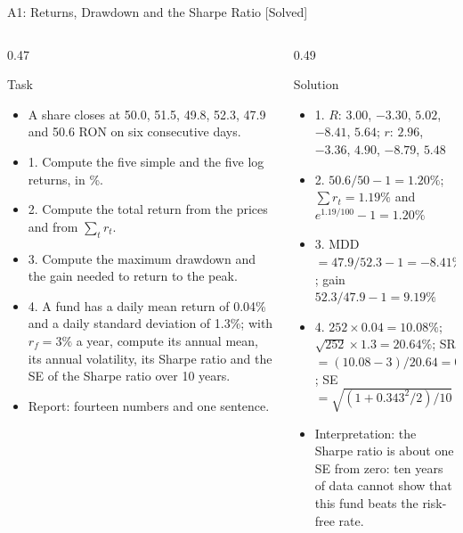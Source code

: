 \begin{frame}{A1: Returns, Drawdown and the Sharpe Ratio [Solved]}
\itemsize{\scriptsize}
\begin{columns}[T]
\begin{column}{0.47\textwidth}
\begin{block}{Task}
\begin{itemize}
    \item A share closes at 50.0, 51.5, 49.8, 52.3, 47.9 and 50.6 RON on six consecutive days.
    \item 1. Compute the five simple and the five log returns, in \%.
    \item 2. Compute the total return from the prices and from $\sum_t r_t$.
    \item 3. Compute the maximum drawdown and the gain needed to return to the peak.
    \item 4. A fund has a daily mean return of 0.04\% and a daily standard deviation of 1.3\%; with $r_f = 3\%$ a year, compute its annual mean, its annual volatility, its Sharpe ratio and the SE of the Sharpe ratio over 10 years.
    \item Report: fourteen numbers and one sentence.
\end{itemize}
\end{block}
\end{column}
\begin{column}{0.49\textwidth}
\begin{exampleblock}{Solution}
\begin{itemize}
    \item 1. $R$: $3.00$, $-3.30$, $5.02$, $-8.41$, $5.64$; $r$: $2.96$, $-3.36$, $4.90$, $-8.79$, $5.48$
    \item 2. $50.6/50 - 1 = 1.20\%$; $\sum r_t = 1.19\%$ and $e^{1.19/100} - 1 = 1.20\%$
    \item 3. MDD $= 47.9/52.3 - 1 = -8.41\%$; gain $52.3/47.9 - 1 = 9.19\%$
    \item 4. $252 \times 0.04 = 10.08\%$; $\sqrt{252} \times 1.3 = 20.64\%$; SR $= (10.08 - 3)/20.64 = 0.343$; SE $= \sqrt{(1 + 0.343^2/2)/10} = 0.33$
    \item Interpretation: the Sharpe ratio is about one SE from zero: ten years of data cannot show that this fund beats the risk-free rate.
\end{itemize}
\end{exampleblock}
\end{column}
\end{columns}
\end{frame}

